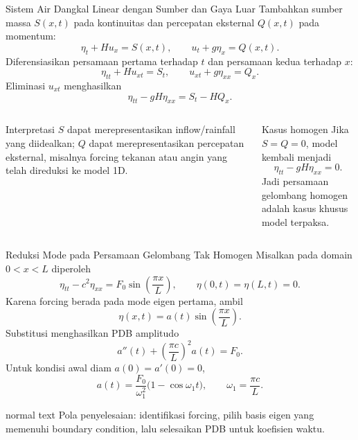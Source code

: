 \documentclass[aspectratio=169,10pt]{beamer}
\begin{document}
\begin{frame}{Sistem Air Dangkal Linear dengan Sumber dan Gaya Luar}
\small
Tambahkan sumber massa $S(x,t)$ pada kontinuitas dan percepatan eksternal $Q(x,t)$ pada momentum:
\[
\eta_t+Hu_x=S(x,t),
\qquad
u_t+g\eta_x=Q(x,t).
\]
Diferensiasikan persamaan pertama terhadap $t$ dan persamaan kedua terhadap $x$:
\[
\eta_{tt}+Hu_{xt}=S_t,
\qquad
u_{xt}+g\eta_{xx}=Q_x.
\]
Eliminasi $u_{xt}$ menghasilkan
\[
\boxed{\eta_{tt}-gH\eta_{xx}=S_t-HQ_x.}
\]
\begin{columns}[T,onlytextwidth]
\begin{block}{Interpretasi}
$S$ dapat merepresentasikan inflow/rainfall yang diidealkan; $Q$ dapat merepresentasikan percepatan eksternal, misalnya forcing tekanan atau angin yang telah direduksi ke model 1D.
\end{block}
\begin{block}{Kasus homogen}
Jika $S=Q=0$, model kembali menjadi
\[
\eta_{tt}-gH\eta_{xx}=0.
\]
Jadi persamaan gelombang homogen adalah kasus khusus model terpaksa.
\end{block}
\end{columns}
\end{frame}

\begin{frame}{Reduksi Mode pada Persamaan Gelombang Tak Homogen}
\small
Misalkan pada domain $0<x<L$ diperoleh
\[
\eta_{tt}-c^2\eta_{xx}=F_0\sin\left(\frac{\pi x}{L}\right),
\qquad
\eta(0,t)=\eta(L,t)=0.
\]
Karena forcing berada pada mode eigen pertama, ambil
\[
\eta(x,t)=a(t)\sin\left(\frac{\pi x}{L}\right).
\]
Substitusi menghasilkan PDB amplitudo
\[
\boxed{a''(t)+\left(\frac{\pi c}{L}\right)^2a(t)=F_0.}
\]
Untuk kondisi awal diam $a(0)=a'(0)=0$,
\[
\boxed{a(t)=\frac{F_0}{\omega_1^2}\bigl(1-\cos\omega_1 t\bigr)},
\qquad \omega_1=\frac{\pi c}{L}.
\]
\begin{beamercolorbox}[sep=.09cm,wd=\textwidth]{normal text}
\centering\small
Pola penyelesaian: identifikasi forcing, pilih basis eigen yang memenuhi boundary condition, lalu selesaikan PDB untuk koefisien waktu.
\end{beamercolorbox}
\end{frame}
\end{document}
